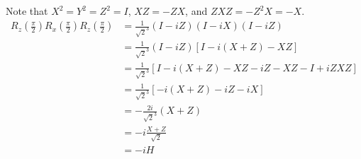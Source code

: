 \begingroup
\newcommand{\roto}[2]{R_{#1} \left( #2 \right)}
%
\par Note that $X^2 = Y^2 = Z^2 = I$, $XZ = -ZX$, and $ZXZ = -Z^2 X = -X$.
%
\begin{align*}
\roto{z}{\frac{\pi}{2}} \roto{x}{\frac{\pi}{2}} \roto{z}{\frac{\pi}{2}} &= \frac{1}{\sqrt{2}^3} \left( I - iZ \right) \left( I - iX \right) \left( I - iZ \right) \\
&= \frac{1}{\sqrt{2}^3} \left( I - iZ \right) \left[ I - i \left( X + Z \right) - XZ \right] \\
&= \frac{1}{\sqrt{2}^3} \left[ I - i \left( X + Z \right) - XZ - iZ - XZ - I + iZXZ \right] \\
&= \frac{1}{\sqrt{2}^3} \left[ - i \left( X + Z \right) - iZ - iX \right] \\
&= -\frac{2i}{\sqrt{2}^3} \left( X + Z \right) \\
&= -i \frac{X + Z}{\sqrt{2}} \\
&= -i H
\end{align*}
%
\endgroup
